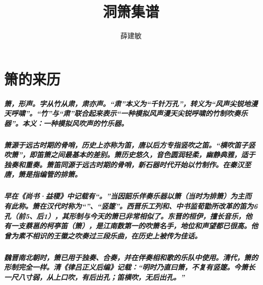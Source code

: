 \documentclass[cn,pad,chinesefont=nofont]{elegantbook}
\title{洞箫集谱}
\author{薛建敏}
\date{\zhtoday}
\begin{document}
\maketitle
\frontmatter
\tableofcontents
\mainmatter

\chapter{箫的来历}
\paragraph*{箫，形声。字从竹从肃，肃亦声。“肃”本义为“千针万孔”，转义为“风声尖锐地漫天呼啸”。“竹”与“肃”联合起来表示“一种模拟风声漫天尖锐呼啸的竹制吹奏乐器”。本义：一种模拟风吹声的竹乐器。}
\paragraph*{箫源于远古时期的骨哨，历史上亦称为笛，唐以后方专指竖吹之笛。“横吹笛子竖吹箫”，即笛箫之间最基本的差别。箫历史悠久，音色圆润轻柔，幽静典雅，适于独奏和重奏。箫笛同源于远古时期的骨哨，新石器时代开始以竹制作。在秦汉至唐，箫是指编管的排箫。} 
\paragraph*{早在《尚书·益稷》中记载有“。”当因韶乐伴奏乐器以箫（当时为排箫）为主而有此称。箫在汉代时称为“”、“竖篴”。西晋乐工列和、中书监荀勖所改革的笛为6 孔（前5、后1），其形制与今天的箫已非常相似了。东晋的桓伊，擅长音乐，他有一支蔡邕的柯亭笛（箫），是江南数第一的吹箫名手，地位和声望都已很高。他曾为素不相识的王徽之吹奏过三段乐曲，在历史上被传为佳话。}
\paragraph*{魏晋南北朝时，箫已用于独奏、合奏，并在伴奏相和歌的乐队中使用。清代，箫的形制完全一样。清《律吕正义后编》记载：“明时乃直曰箫，不复有竖篴。今箫长一尺八寸弱，从上口吹，有后出孔；笛横吹，无后出孔。”}
\end{document}
